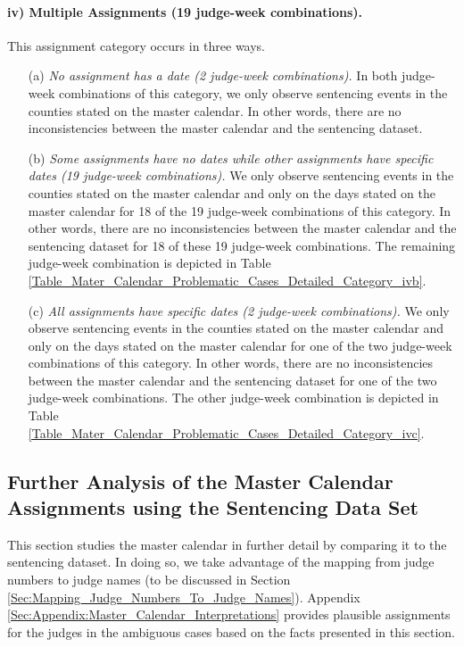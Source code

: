 \documentclass[11pt, oneside]{article}   	%
\theoremstyle{ModifiedStyle}
\begin{document}
\vspace{-3mm}
\paragraph{iv) Multiple Assignments (19 judge-week combinations).}
\label{Category_iv}
This assignment category occurs in three ways.
	\begin{itemize}
		\item[(a)] \emph{No assignment has a date (2 judge-week combinations).} In both judge-week combinations of this category, we only observe sentencing events in the counties stated on the master calendar. In other words, there are no inconsistencies between the master calendar and the sentencing dataset.
		\item[(b)] \emph{Some assignments have no dates while other assignments have specific dates (19 judge-week combinations).} We only observe sentencing events in the counties stated on the master calendar and only on the days stated on the master calendar for 18 of the 19 judge-week combinations of this category. In other words, there are no inconsistencies between the master calendar and the sentencing dataset for 18 of these 19 judge-week combinations. The remaining judge-week combination is depicted in Table \ref{Table_Mater_Calendar_Problematic_Cases_Detailed_Category_ivb}.
		\item[(c)] \emph{All assignments have specific dates (2 judge-week combinations).} We only observe sentencing events in the counties stated on the master calendar and only on the days stated on the master calendar for one of the two judge-week combinations of this category. In other words, there are no inconsistencies between the master calendar and the sentencing dataset for one of the two judge-week combinations. The other judge-week combination is depicted in Table \ref{Table_Mater_Calendar_Problematic_Cases_Detailed_Category_ivc}.
	\end{itemize}


\subsection{Further Analysis of the Master Calendar Assignments using the Sentencing Data Set}
\label{Sec:Master_Calendar:Further_Analysis_of_Some_Assignments}

This section studies the master calendar in further detail by comparing it to the sentencing dataset. In doing so, we take advantage of the mapping from judge numbers to judge names (to be discussed in Section \ref{Sec:Mapping_Judge_Numbers_To_Judge_Names}). Appendix \ref{Sec:Appendix:Master_Calendar_Interpretations} provides plausible assignments for the judges in the ambiguous cases based on the facts presented in this section.
\end{document}
